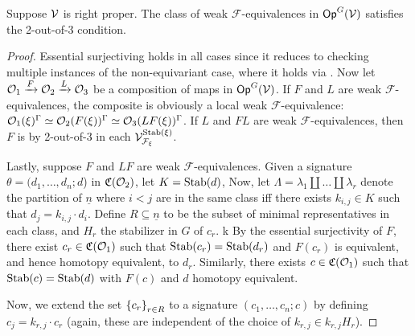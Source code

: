 \documentclass[a4paper,10pt
,draft
]{article}%
\renewcommand{\F}{\mathcal F}
\renewcommand{\1}{\ensuremath{\mathbb{id}}}
\begin{document}
\begin{proposition}
      \label{CAV_4.15_PROP}
      Suppose $\mathcal V$ is right proper.
      The class of weak $\F$-equivalences in $\mathsf{Op}^G(\mathcal V)$ satisfies the 2-out-of-3 condition.
\end{proposition}
\begin{proof}
      Essential surjectiving holds in all cases since it reduces to checking multiple instances of the non-equivariant case,
      where it holds via \cite[4.15]{Cav14}.
      Now let $\mathcal{O}_1 \xrightarrow{F} \mathcal{O}_2 \xrightarrow{L} \mathcal{O}_3$ be a composition of maps in $\mathsf{Op}^G(\mathcal V)$.
      If $F$ and $L$ are weak $\F$-equivalences,
      the composite is obviously a local weak $\F$-equivalence:
      $\mathcal{O}_1(\xi)^\Gamma \simeq \mathcal{O}_2(F(\xi))^\Gamma \simeq \mathcal{O}_3(LF(\xi))^\Gamma$.
      If $L$ and $FL$ are weak $\F$-equivalences,
      then $F$ is by 2-out-of-3 in each $\V^{\Stab(\xi)}_{\F_\xi}$.

      Lastly, suppose $F$ and $LF$ are weak $\F$-equivalences.
      Given a signature $\theta = (d_1,\ldots,d_n;d$) in $\mathfrak C(\mathcal{O}_2)$, let $K = \mathrm{Stab}(d)$,
      Now, let $\Lambda = \lambda_1 \amalg \dots \amalg \lambda_r$ denote the partition of $\underline{n}$
      where $i < j$ are in the same class iff there exists $k_{i,j} \in K$ such that $d_j = k_{i,j} \cdot d_i$.
      Define $R \subseteq \underline{n}$ to be the subset of minimal representatives in each class,
      and $H_r$ the stabilizer in $G$ of $c_r$.
k
      By the essential surjectivity of $F$, there exist $c_r \in \mathfrak C(\mathcal{O}_1)$ such that
      $\mathrm{Stab}(c_r) = \mathrm{Stab}(d_r)$ and $F(c_r)$ is equivalent, and hence homotopy equivalent, to $d_r$.
      Similarly, there exists $c\in \mathfrak C(\mathcal{O}_1)$ such that $\mathrm{Stab}(c) = \mathrm{Stab}(d)$ with $F(c)$ and $d$ homotopy equivalent. 

      Now, we extend the set $\left\{c_r\right\}_{r\in R}$ to a signature $(c_1,\ldots, c_n;c)$ by defining $c_j = k_{r,j} \cdot c_r$
      (again, these are independent of the choice of $k_{r,j} \in k_{r,j}H_r$).


\end{proof}
\end{document}
